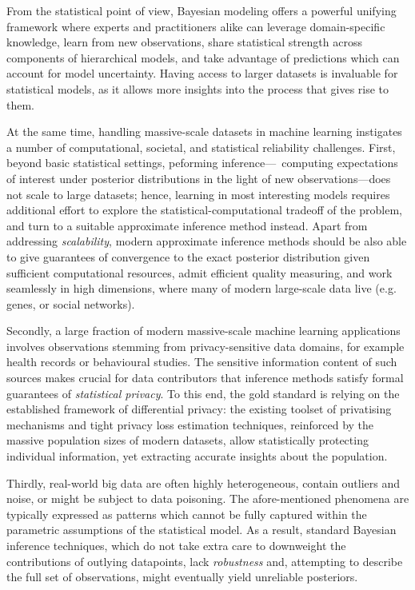 From the statistical point of view, Bayesian modeling offers a powerful unifying framework where experts and practitioners alike can leverage domain-specific knowledge, learn from new observations, share statistical strength across components of hierarchical models, and take advantage of predictions which can account for model uncertainty. Having access to larger datasets is invaluable for statistical models, as it allows more insights into the process that gives rise to them. 

At the same time, handling massive-scale datasets in machine learning instigates a number of computational, societal, and statistical reliability challenges. First, beyond basic statistical settings, peforming inference---\ie~computing expectations of interest under posterior distributions in the light of new observations---does not scale to large datasets; hence, learning in most interesting models requires additional effort to explore the statistical-computational tradeoff of the problem, and turn to a suitable approximate inference method instead. Apart from addressing \emph{scalability}, modern approximate inference methods should be also able to give guarantees of convergence to the exact posterior distribution given sufficient computational resources, admit efficient quality measuring, and work seamlessly in high dimensions, where many of modern large-scale data live (e.g. genes, or social networks).

Secondly, a large fraction of modern massive-scale machine learning applications involves observations stemming from privacy-sensitive data domains, for example health records or behavioural studies. The sensitive information content of such sources makes crucial for data contributors that inference methods satisfy formal guarantees of \emph{statistical privacy}. To this end, the gold standard is relying on the established framework of differential privacy: the existing toolset of privatising mechanisms and tight privacy loss estimation techniques, reinforced by the massive population sizes of modern datasets, allow statistically protecting individual information, yet extracting accurate insights about the population.

Thirdly, real-world big data are often highly heterogeneous, contain outliers and noise, or might be subject to data poisoning. The afore-mentioned phenomena are typically expressed as patterns which cannot be fully captured within the parametric assumptions of the statistical model. As a result, standard Bayesian inference techniques, which do not take extra care to downweight the contributions of outlying datapoints, lack \emph{robustness} and, attempting to describe the full set of observations, might eventually yield unreliable posteriors. 

